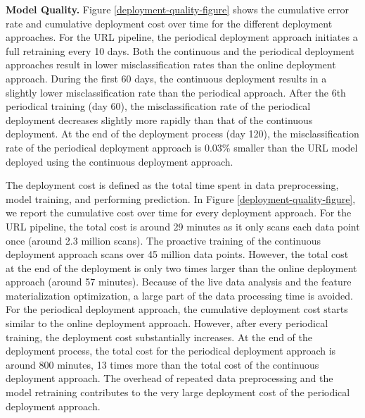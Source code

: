 \textbf{Model Quality. }
Figure \ref{deployment-quality-figure} shows the cumulative error rate and cumulative deployment cost over time for the different deployment approaches.
For the URL pipeline, the periodical deployment approach initiates a full retraining every 10 days.
Both the continuous and the periodical deployment approaches result in lower misclassification rates than the online deployment approach.
During the first 60 days, the continuous deployment results in a slightly lower misclassification rate than the periodical approach.
After the 6th periodical training (day 60), the misclassification rate of the periodical deployment decreases slightly more rapidly than that of the continuous deployment. 
At the end of the deployment process (day 120), the misclassification rate of the periodical deployment approach is 0.03\% smaller than the URL model deployed using the continuous deployment approach.
\begin{figure*}[t]
\centering
\resizebox{\textwidth}{!}{}
\caption{Model Quality and Training cost for different deployment approaches}
\label{deployment-quality-figure}
\end{figure*}

The deployment cost is defined as the total time spent in data preprocessing, model training, and performing prediction.
In Figure \ref{deployment-quality-figure}, we report the cumulative cost over time for every deployment approach.
For the URL pipeline, the total cost is around 29 minutes as it only scans each data point once (around 2.3 million scans).  
The proactive training of the continuous deployment approach scans over 45 million data points.
However, the total cost at the end of the deployment is only two times larger than the online deployment approach (around 57 minutes).  
Because of the live data analysis and the feature materialization optimization, a large part of the data processing time is avoided.
For the periodical deployment approach, the cumulative deployment cost starts similar to the online deployment approach.
However, after every periodical training, the deployment cost substantially increases.
At the end of the deployment process, the total cost for the periodical deployment approach is around 800 minutes, 13 times more than the total cost of the continuous deployment approach.
The overhead of repeated data preprocessing and the model retraining contributes to the very large deployment cost of the periodical deployment approach.

